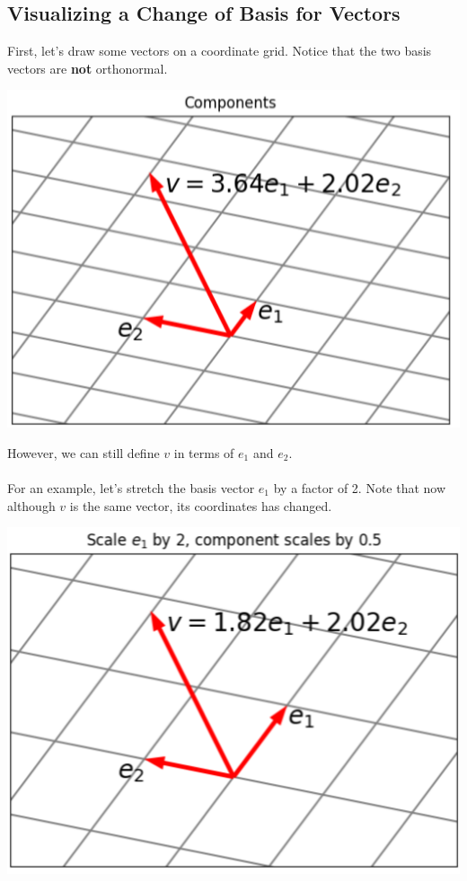 \documentclass[10pt]{article}
\begin{document}
\subsection*{Visualizing a Change of Basis for Vectors}
First, let's draw some vectors on a coordinate grid.  Notice that the two basis vectors are \textbf{not} orthonormal.
\begin{center}
    \includegraphics*[scale=0.9]{W2_6.png}
\end{center}
However, we can still define $v$ in terms of $e_1$ and $e_2$.\\\\
For an example, let's stretch the basis vector $e_1$ by a factor of 2.  Note that now although $v$ is the same vector, its coordinates has changed.
\begin{center}
    \includegraphics*[scale=0.9]{W2_7.png}
\end{center}
\end{document}
